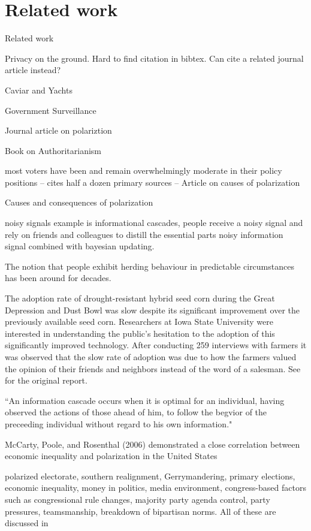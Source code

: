 
\section{Related work}
\label{sec:related}

Related work

Privacy on the ground. Hard to find citation in bibtex. Can cite a related journal article instead?

Caviar and Yachts \cite{johnsoncaviar}

Government Surveillance \cite{laskowskigovernment}

Journal article on polariztion \cite{poole1984polarization}

Book on Authoritarianism \cite{hetherington2009authoritarianism}

 most voters have been
and remain overwhelmingly moderate in their policy positions -- cites half a dozen primary sources -- Article on causes of polarization \cite{layman2006party}

Causes and consequences of polarization \cite{barber2015causes}

noisy signals example is informational cascades, people receive a noisy signal and rely on friends and colleagues to distill the essential parts
noisy information signal combined with bayesian updating. 



The notion that people exhibit herding behaviour in predictable circumstances has been around for decades. \cite{shiller1995conversation}

The adoption rate of drought-resistant hybrid seed corn during the Great Depression and Dust Bowl was slow despite its significant improvement over the previously available seed corn. Researchers at Iowa State University were interested in understanding the public's hesitation to the adoption of this significantly improved technology. After conducting 259 interviews with farmers \cite{carboneau2005using} it was observed that the slow rate of adoption was due to how the farmers valued the opinion of their friends and neighbors instead of the word of a salesman. See \cite{beal1957diffusion} for the original report.


\cite{bikhchandani1992theory}
``An information cascade occurs when it is optimal for an individual, having observed the actions of those ahead of him, to follow the begvior of the preceeding individual without regard to his own information."



McCarty, Poole, and Rosenthal (2006) demonstrated a close correlation between economic
inequality and polarization in the United States


polarized electorate, southern realignment, Gerrymandering, primary elections, economic inequality, money in politics, media environment, congress-based factors such as congressional rule changes, majority party agenda control, party pressures, teamsmanship, breakdown of bipartisan norms.  All of these are discussed in  \cite{poole1984polarization}